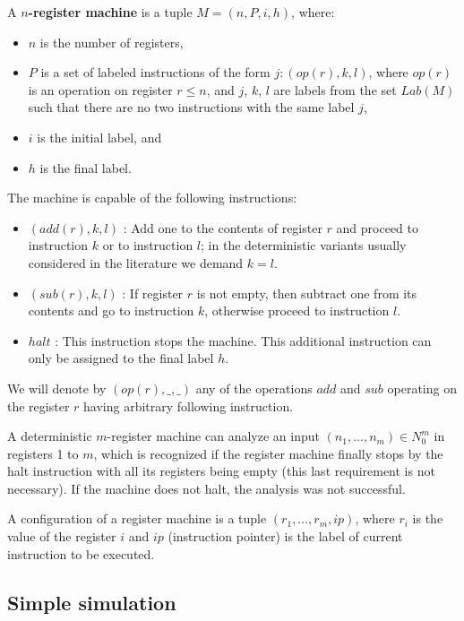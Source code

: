 \documentclass[submission,copyright,creativecommons]{../lib/lncs/llncs}
\begin{document}
\begin{definition}
  A {\bf $n$-register machine} is a tuple $M = (n,P,i,h)$, where:
  \begin{itemize}
    \item $n$ is the number of registers,
    \item $P$ is a set of labeled instructions of the form $j : (op(r),k,l)$, where $op(r)$ is an operation on register $r\leq n$, and $j$, $k$, $l$ are labels from the set $Lab(M)$ such that there are no two instructions with the same label $j$,
    \item $i$ is the initial label, and
    \item $h$ is the final label.
  \end{itemize}
\end{definition}

The machine is capable of the following instructions:
\begin{itemize}
  \item $(add(r),k,l)$ : Add one to the contents of register $r$ and proceed to instruction $k$ or to instruction $l$; in the deterministic variants usually considered in the literature we demand $k = l$.
  \item $(sub(r),k,l)$ : If register $r$ is not empty, then subtract one from its contents and go to instruction $k$, otherwise proceed to instruction $l$.
  \item $halt$ : This instruction stops the machine. This additional instruction can only be assigned to the final label $h$.
\end{itemize}

We will denote by $(op(r), \_, \_)$ any of the operations $add$ and $sub$ operating on the register $r$ having arbitrary following instruction. 

A deterministic $m$-register machine can analyze an input $(n_1,\dots,n_m)\in N_0^m$ in registers 1 to $m$, which is recognized if the register machine finally stops by the halt instruction with all its registers being empty (this last requirement is not necessary). If the machine does not halt, the analysis was not successful.

A configuration of a register machine is a tuple $(r_1, \ldots, r_m, ip)$, where $r_i$ is the value of the register $i$ and $ip$ (instruction pointer) is the label of current instruction to be executed.


\subsection{Simple simulation} %
\label{sub:simple_simulation}
\end{document}
